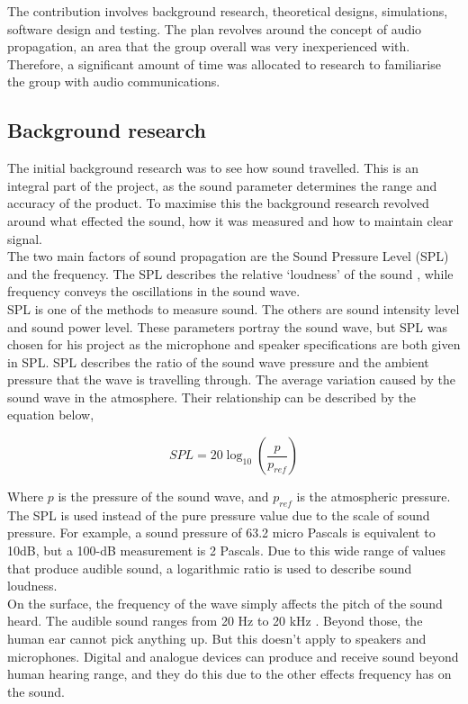 
The contribution involves background research, theoretical designs, simulations, software design and testing. The plan revolves around the concept of audio propagation, an area that the group overall was very inexperienced with. Therefore, a significant amount of time was allocated to research to familiarise the group with audio communications.   

\subsection{Background research}

The initial background research was to see how sound travelled. This is an integral part of the project, as the sound parameter determines the range and accuracy of the product. To maximise this the background research revolved around what effected the sound, how it was measured and how to maintain clear signal. \\

The two main factors of sound propagation are the Sound Pressure Level (SPL) and the frequency. The SPL describes the relative ‘loudness’ of the sound \cite{SPL}, while frequency conveys the oscillations in the sound wave. \\

SPL is one of the methods to measure sound. The others are sound intensity level and sound power level. These parameters portray the sound wave, but SPL was chosen for his project as the microphone and speaker specifications are both given in SPL. SPL describes the ratio of the sound wave pressure and the ambient pressure that the wave is travelling through. The average variation caused by the sound wave in the atmosphere. Their relationship can be described by the equation below,

\begin{equation}
SPL = 20\log_{10}\left(\frac{p}{p_{ref}}\right) 
\end{equation}

Where \( p\) is the pressure of the sound wave, and \( p_{ref}\) is the atmospheric pressure. The SPL is used instead of the pure pressure value due to the scale of sound pressure. For example, a sound pressure of 63.2 micro Pascals is equivalent to 10dB, but a 100-dB measurement is 2 Pascals. Due to this wide range of values that produce audible sound, a logarithmic ratio is used to describe sound loudness.\\

On the surface, the frequency of the wave simply affects the pitch of the sound heard. The audible sound ranges from 20 Hz to 20 kHz  \cite{neuroscience}. Beyond those, the human ear cannot pick anything up. But this doesn't apply to speakers and microphones. Digital and analogue devices can produce and receive sound beyond human hearing range, and they do this due to the other effects frequency has on the sound. \\

